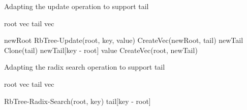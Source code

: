 \begin{listing}[ht!]
    \caption{Adapting the update operation to support tail}
    \label{lst:pvec-update}
    
    \begin{algorithmic}

        \State root \la vec
        \State tail \la vec

            \State newRoot \la RbTree-Update(root, key, value)
            \State \Return CreateVec(newRoot, tail)
        \Else
            \State newTail \la Clone(tail)
            \State newTail[key - root] \la value
            \State \Return CreateVec(root, newTail)
        \EndIf        
        \EndFunction
    \end{algorithmic}
\end{listing}

\begin{listing}[ht!]
    \caption{Adapting the radix search operation to support tail}
    \label{lst:pvec-radix-search}
    
    \begin{algorithmic}
        
        \State root \la vec
        \State tail \la vec

            \State \Return RbTree-Radix-Search(root, key)            
        \Else            
            \State \Return tail[key - root]            
        \EndIf
        \EndFunction
    \end{algorithmic}
\end{listing}